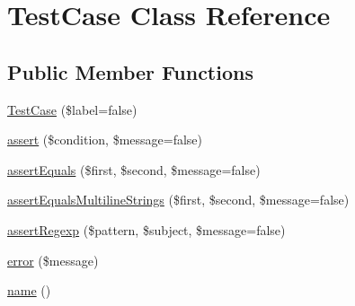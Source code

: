 \hypertarget{class_test_case}{
\section{TestCase Class Reference}
\label{class_test_case}
}
\subsection*{Public Member Functions}
\begin{DoxyCompactItemize}
\item 
\hyperlink{class_test_case_aa9f6e3096465c14ae196869c4062dcbf}{TestCase} (\$label=false)
\item 
\hyperlink{class_test_case_a5833f594930beb55e38d29331dc3908f}{assert} (\$condition, \$message=false)
\item 
\hyperlink{class_test_case_a6315b8392b57be03f75453c3dd63e04a}{assertEquals} (\$first, \$second, \$message=false)
\item 
\hyperlink{class_test_case_a1069303e24b7cef670a045e017c7465c}{assertEqualsMultilineStrings} (\$first, \$second, \$message=false)
\item 
\hyperlink{class_test_case_a342e763f086479a4dfd80d719145dffd}{assertRegexp} (\$pattern, \$subject, \$message=false)
\item 
\hyperlink{class_test_case_ac90136f48031a65db56fce777773129c}{error} (\$message)
\item 
\hyperlink{class_test_case_a0e29a22bb0eb113598d328e2acf64c62}{name} ()
\end{DoxyCompactItemize}


